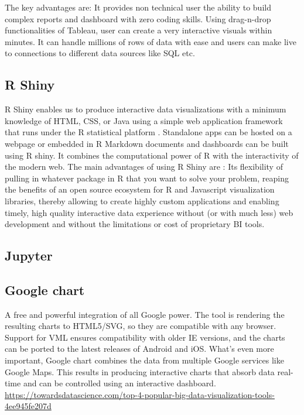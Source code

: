 \documentclass[]{book}
\theoremstyle{definition}
\theoremstyle{definition}
\theoremstyle{definition}
\theoremstyle{remark}
\begin{document}
The key advantages are: It provides non technical user the ability to
build complex reports and dashboard with zero coding skills. Using
drag-n-drop functionalities of Tableau, user can create a very
interactive visuals within minutes. It can handle millions of rows of
data with ease and users can make live to connections to different data
sources like SQL etc.

\subsection{R Shiny}\label{r-shiny}

R Shiny enables us to produce interactive data visualizations with a
minimum knowledge of HTML, CSS, or Java using a simple web application
framework that runs under the R statistical platform
\citep{shiny_interactive_viz}. Standalone apps can be hosted on a
webpage or embedded in R Markdown documents and dashboards can be built
using R shiny. It combines the computational power of R with the
interactivity of the modern web. The main advantages of using R Shiny
are : Its flexibility of pulling in whatever package in R that you want
to solve your problem, reaping the benefits of an open source ecosystem
for R and Javascript visualization libraries, thereby allowing to create
highly custom applications and enabling timely, high quality interactive
data experience without (or with much less) web development and without
the limitations or cost of proprietary BI tools.

\subsection{Jupyter}\label{jupyter}

\subsection{Google chart}\label{google-chart}

A free and powerful integration of all Google power. The tool is
rendering the resulting charts to HTML5/SVG, so they are compatible with
any browser. Support for VML ensures compatibility with older IE
versions, and the charts can be ported to the latest releases of Android
and iOS. What's even more important, Google chart combines the data from
multiple Google services like Google Maps. This results in producing
interactive charts that absorb data real-time and can be controlled
using an interactive dashboard.
\url{https://towardsdatascience.com/top-4-popular-big-data-visualization-tools-4ee945fe207d}
\end{document}
